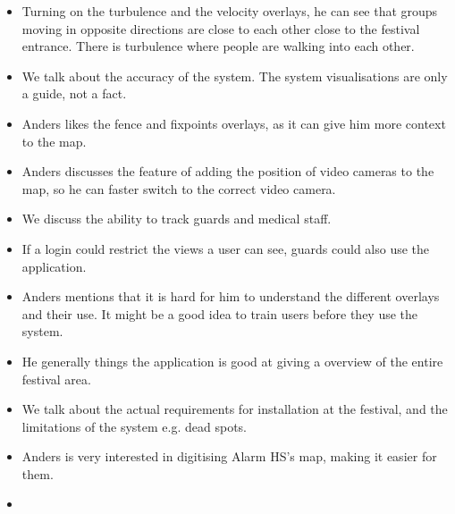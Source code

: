 \begin{itemize}
    \item Turning on the turbulence and the velocity overlays, he can see that groups moving in opposite directions are close to each other close to the festival entrance. There is turbulence where people are walking into each other.
    \item We talk about the accuracy of the system. The system visualisations are only a guide, not a fact.
    \item Anders likes the fence and fixpoints overlays, as it can give him more context to the map.
    \item Anders discusses the feature of adding the position of video cameras to the map, so he can faster switch to the correct video camera.
    \item We discuss the ability to track guards and medical staff.
    \item If a login could restrict the views a user can see, guards could also use the application.
    \item Anders mentions that it is hard for him to understand the different overlays and their use. It might be a good idea to train users before they use the system.
    \item He generally things the application is good at giving a overview of the entire festival area.
    \item We talk about the actual requirements for installation at the festival, and the limitations of the system e.g. dead spots.
    \item Anders is very interested in digitising Alarm HS's map, making it easier for them.
    \item 
\end{itemize}